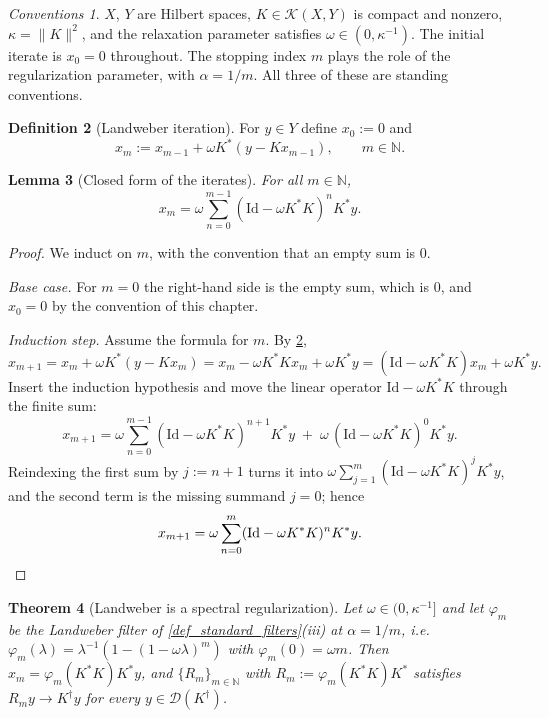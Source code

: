 \documentclass[a4paper]{report}
\theoremstyle{plain}
\newtheorem{theorem}{Theorem}[chapter]
\newtheorem{lemma}[theorem]{Lemma}
\theoremstyle{definition}
\newtheorem{definition}[theorem]{Definition}
\theoremstyle{remark}
\newtheorem{assumptions}[theorem]{Conventions}
\newcommand{\Kk}{\mathcal{K}}
\newcommand{\Dom}{\mathcal{D}}
\newcommand{\Id}{\mathrm{Id}}
\newcommand{\dg}{^{\dagger}}
\begin{document}
\begin{assumptions}
  \label{asm_landweber_regularization}
  $X$, $Y$ are Hilbert spaces, $K \in \Kk(X,Y)$ is
compact and nonzero, $\kappa = \|K\|^{2}$, and the relaxation parameter satisfies
$\omega \in (0,\kappa^{-1})$.  The initial iterate is $x_0 = 0$ throughout.
The stopping index $m$ plays the role of the regularization parameter, with
$\alpha = 1/m$.  All three of these are standing conventions.
\end{assumptions}

\begin{definition}[Landweber iteration]
  \label{def_landweber}
  For $y \in Y$ define $x_0 := 0$ and
  \[
    x_m := x_{m-1} + \omega K^{*}(y - Kx_{m-1}), \qquad m \in \mathbb{N} .
  \]
\end{definition}


\begin{lemma}[Closed form of the iterates]
  \label{lem_landweber_closed_form}
  For all $m \in \mathbb{N}$,
  \[
    x_m = \omega \sum_{n=0}^{m-1} (\Id - \omega K^{*}K)^{n} K^{*} y .
  \]
\end{lemma}

\begin{proof}
  We induct on $m$, with the convention that an empty sum is $0$.

  \emph{Base case.}  For $m = 0$ the right-hand side is the empty sum, which is $0$, and
  $x_0 = 0$ by the convention of this chapter.

  \emph{Induction step.}  Assume the formula for $m$.  By \cref{def_landweber},
  \[
    x_{m+1} = x_m + \omega K^{*}(y - Kx_m)
      = x_m - \omega K^{*}Kx_m + \omega K^{*}y
      = (\Id - \omega K^{*}K)x_m + \omega K^{*}y .
  \]
  Insert the induction hypothesis and move the linear operator
  $\Id - \omega K^{*}K$ through the finite sum:
  \[
    x_{m+1} = \omega \sum_{n=0}^{m-1}(\Id - \omega K^{*}K)^{n+1}K^{*}y
      \;+\; \omega\,(\Id - \omega K^{*}K)^{0}K^{*}y .
  \]
  Reindexing the first sum by $j := n+1$ turns it into $\omega\sum_{j=1}^{m}(\Id -
  \omega K^{*}K)^{j}K^{*}y$, and the second term is the missing summand $j = 0$; hence
  \[
    x_{m+1} = \omega \sum_{n=0}^{m}(\Id - \omega K^{*}K)^{n}K^{*}y . \qedhere
  \]
\end{proof}


\begin{theorem}[Landweber is a spectral regularization]
  \label{thm_landweber_regularization}
  Let $\omega \in (0,\kappa^{-1}]$ and let $\varphi_m$ be the Landweber filter of
  \cref{def_standard_filters}(iii) at $\alpha = 1/m$, i.e.\
  $\varphi_m(\lambda) = \lambda^{-1}(1 - (1-\omega\lambda)^{m})$ with
  $\varphi_m(0) = \omega m$.  Then $x_m = \varphi_m(K^{*}K)K^{*}y$, and
  $\{R_m\}_{m \in \mathbb{N}}$ with $R_m := \varphi_m(K^{*}K)K^{*}$ satisfies
  $R_m y \to K\dg y$ for every $y \in \Dom(K\dg)$.
\end{theorem}
\end{document}

